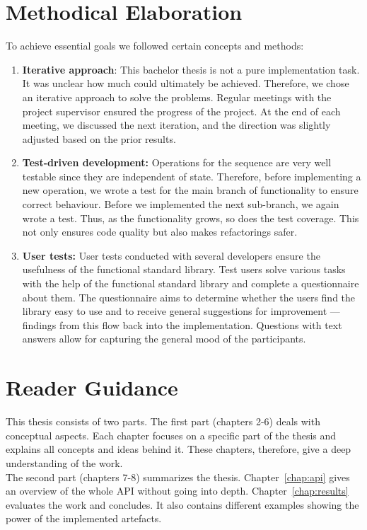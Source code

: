 \section*{Methodical Elaboration} %
\label{sec:intro_methoical_elaboration}
\thispagestyle{empty}
To achieve essential goals we followed certain concepts and methods:
\begin{enumerate}
  \item \textbf{Iterative approach}: This bachelor thesis is not a pure
    implementation task. It was unclear how much could ultimately be achieved.
    Therefore, we chose an iterative approach to solve the problems. Regular
    meetings with the project supervisor ensured the progress of the project.
    At the end of each meeting, we discussed the next iteration, and the
    direction was slightly adjusted based on the prior results.
  \item \textbf{Test-driven development:} Operations for the sequence are very
    well testable since they are independent of state. Therefore, before
    implementing a new operation, we wrote a test for the main branch of
    functionality to ensure correct behaviour. Before we implemented the next
    sub-branch, we again wrote a test. Thus, as the functionality grows, so
    does the test coverage. This not only ensures code quality but also makes
    refactorings safer.
    \item  \textbf{User tests:} User tests conducted
    with several developers ensure the usefulness of the functional standard
    library. Test users solve various tasks with the help of the functional
    standard library and complete a questionnaire about them. The questionnaire
    aims to determine whether the users find the library easy to use and to
    receive general suggestions for improvement — findings from this flow back
    into the implementation. Questions with text answers allow for capturing the
    general mood of the participants.
\end{enumerate}

\section*{Reader Guidance} %
\label{sec:Reader Guidance}
\thispagestyle{empty}
This thesis consists of two parts. The first part (chapters 2-6) deals with
conceptual aspects. Each chapter focuses on a specific part of the thesis and
explains all concepts and ideas behind it. These chapters, therefore, give a
deep understanding of the work.\\
The second part (chapters 7-8) summarizes the thesis. Chapter~\ref{chap:api}
gives an overview of the whole API without going into depth.
Chapter~\ref{chap:results} evaluates the work and concludes. It also contains
different examples showing the power of the implemented artefacts.
